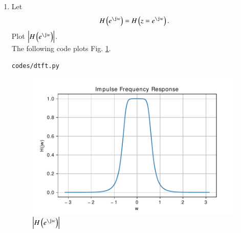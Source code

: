 \documentclass[journal,12pt,twocolumn]{IEEEtran}
\renewcommand\thesection{\arabic{section}}
\begin{document}
\begin{enumerate}[label=\thesection.\arabic*,ref=\thesection.\theenumi]
\item 
Let
\begin{equation}
H\brak{e^{\j w}} = H\brak{z = e^{\j w}}.
\end{equation}
Plot $\abs{H\brak{e^{\j w}}}$.
\\
\solution
The following code plots Fig. \ref{fig:H(jw)}.
\begin{lstlisting}
codes/dtft.py
\end{lstlisting}
\begin{figure}[!ht]
\centering
\includegraphics[width=\columnwidth]{./figs/dtft}
\caption{$\abs{H\brak{e^{\j w}}}$}
\label{fig:H(jw)}
\end{figure}
\end{enumerate}
\end{document}
